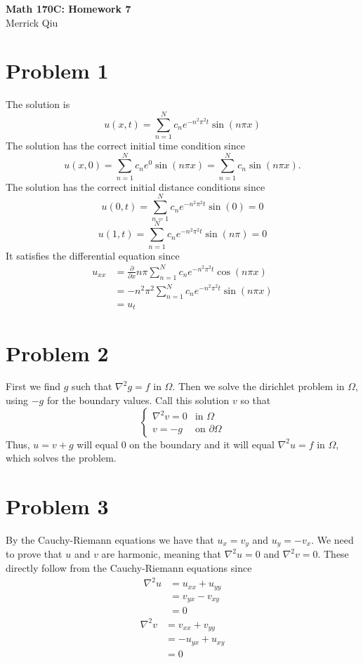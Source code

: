 \documentclass{article}
\begin{document}
\begin{center}
	\huge{\bf Math 170C: Homework 7} \\
	Merrick Qiu
\end{center}

\section*{Problem 1}
The solution is
\[
	u(x,t) = \sum_{n=1}^N c_n e^{-n^2\pi^2t}\sin(n\pi x)
\]
The solution has the correct initial time condition since
\[
	u(x,0) = \sum_{n=1}^N c_n e^{0}\sin(n\pi x) =  \sum_{n=1}^N c_n \sin(n\pi x).
\]
The solution has the correct initial distance conditions since
\[
	u(0,t) = \sum_{n=1}^N c_n e^{-n^2\pi^2t}\sin(0) = 0
\]
\[
	u(1,t) = \sum_{n=1}^N c_n e^{-n^2\pi^2t}\sin(n\pi) = 0
\]
It satisfies the differential equation since 
\begin{align*}
	u_{xx} &= \frac{\partial}{\partial x} n\pi \sum_{n=1}^N c_n e^{-n^2\pi^2t}\cos(n\pi x) \\
	&= -n^2\pi^2\sum_{n=1}^N c_n e^{-n^2\pi^2t}\sin(n\pi x) \\
	&= u_t
\end{align*}
\newpage

\section*{Problem 2}
First we find $g$ such that $\nabla^2 g = f$ in $\Omega$.
Then we solve the dirichlet problem in $\Omega$, using $-g$ for the boundary values.
Call this solution $v$ so that 
\[
	\begin{cases}
		\nabla^2 v = 0 & \text{in } \Omega \\
		v = -g & \text{on } \partial \Omega
	\end{cases}
\]
Thus, $u = v + g$ will equal $0$ on the boundary and it will equal $\nabla^2 u = f$ in $\Omega$,
which solves the problem.
\newpage 

\section*{Problem 3}
By the Cauchy-Riemann equations we have that $u_x = v_y$ and $u_y = -v_x$.
We need to prove that $u$ and $v$ are harmonic, meaning that $\nabla^2 u = 0$ and $\nabla^2 v = 0$.
These directly follow from the Cauchy-Riemann equations since
\begin{align*}
	\nabla^2 u &= u_{xx} + u_{yy} \\
	&= v_{yx} - v_{xy} \\
	&= 0
\end{align*}
\begin{align*}
	\nabla^2 v &= v_{xx} + v_{yy} \\
	&= - u_{yx} + u_{xy} \\
	&= 0
\end{align*}
\newpage
\end{document}
